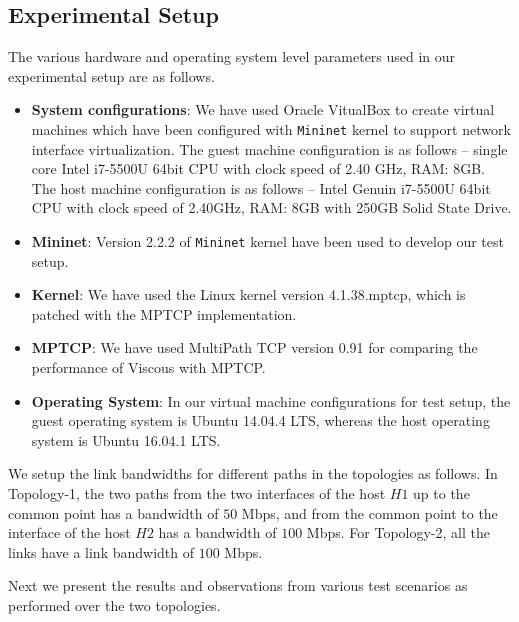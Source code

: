 \subsection{Experimental Setup}
The various hardware and operating system level parameters used in our experimental setup are as follows. 
\begin{itemize}
    \item \textbf{System configurations}: We have used Oracle VitualBox to create virtual machines which have been configured with \texttt{Mininet} kernel to support network interface virtualization. The guest machine configuration is as follows -- single core Intel i7-5500U 64bit CPU with clock speed of 2.40 GHz, RAM: 8GB. The host machine configuration is as follows -- Intel Genuin i7-5500U 64bit CPU with clock speed of 2.40GHz, RAM: 8GB with 250GB Solid State Drive.
    \item \textbf{Mininet}: Version 2.2.2 of \texttt{Mininet} kernel have been used to develop our test setup.
    \item \textbf{Kernel}: We have used the Linux kernel version 4.1.38.mptcp, which is patched with the MPTCP implementation.
    \item \textbf{MPTCP}: We have used MultiPath TCP version 0.91 for comparing the performance of Viscous with MPTCP.
    \item \textbf{Operating System}: In our virtual machine configurations for test setup, the guest operating system is Ubuntu 14.04.4 LTS, whereas the host operating system is Ubuntu 16.04.1 LTS. 
\end{itemize}
We setup the link bandwidths for different paths in the topologies as follows. In Topology-1, the two paths from the two interfaces of the host $H1$ up to the common point has a bandwidth of $50$ Mbps, and from the common point to the interface of the host $H2$ has a bandwidth of $100$ Mbps. For Topology-2, all the links have a link bandwidth of $100$ Mbps. 
 
Next we present the results and observations from various test scenarios as performed over the two topologies. 

